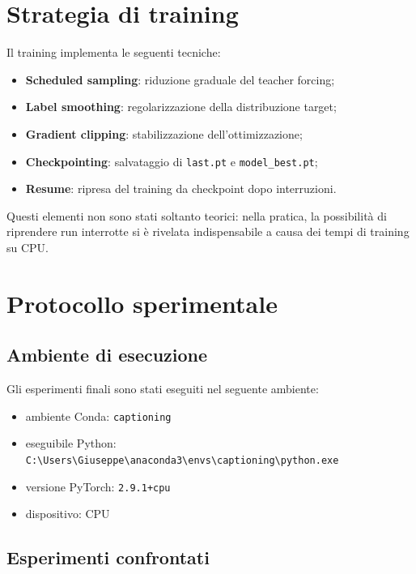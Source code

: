 \documentclass[12pt,a4paper]{article}
\begin{document}
\section{Strategia di training}

Il training implementa le seguenti tecniche:
\begin{itemize}[leftmargin=*]
    \item \textbf{Scheduled sampling}: riduzione graduale del teacher forcing;
    \item \textbf{Label smoothing}: regolarizzazione della distribuzione target;
    \item \textbf{Gradient clipping}: stabilizzazione dell'ottimizzazione;
    \item \textbf{Checkpointing}: salvataggio di \texttt{last.pt} e \texttt{model\_best.pt};
    \item \textbf{Resume}: ripresa del training da checkpoint dopo interruzioni.
\end{itemize}

Questi elementi non sono stati soltanto teorici: nella pratica, la possibilità di riprendere run interrotte si è rivelata indispensabile a causa dei tempi di training su CPU.

\section{Protocollo sperimentale}

\subsection{Ambiente di esecuzione}

Gli esperimenti finali sono stati eseguiti nel seguente ambiente:
\begin{itemize}[leftmargin=*]
    \item ambiente Conda: \texttt{captioning}
    \item eseguibile Python: \texttt{C:\textbackslash Users\textbackslash Giuseppe\textbackslash anaconda3\textbackslash envs\textbackslash captioning\textbackslash python.exe}
    \item versione PyTorch: \texttt{2.9.1+cpu}
    \item dispositivo: CPU
\end{itemize}

\subsection{Esperimenti confrontati}
\end{document}

